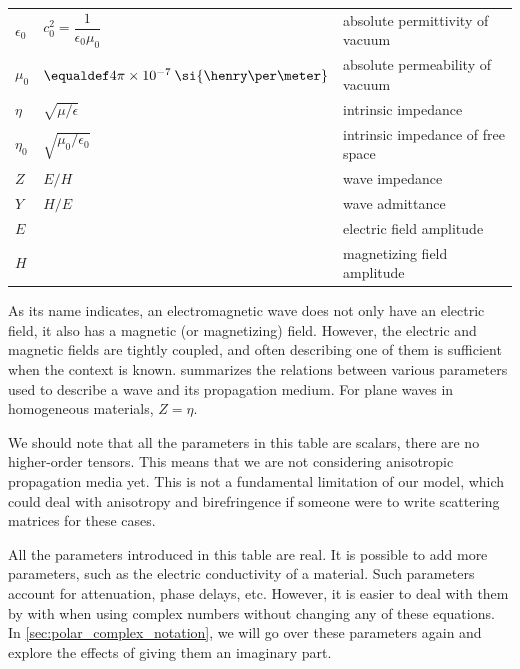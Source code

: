 \begin{table}[hbtp]
\begin{tabularx}{\textwidth}{l l X}
        $\epsilon_0$  & $c_0^2=\dfrac{1}{\epsilon_0 \mu_0}$  &  absolute permittivity of vacuum \\
        $\mu_0$       & $\equaldef 4\pi\times 10^{-7}\>\si{\henry\per\meter}$  &  absolute permeability of vacuum \\
        $\eta$        & $\sqrt{\mu / \epsilon}$  &  intrinsic impedance\\
        $\eta_0$      & $\sqrt{\mu_0 / \epsilon_0}$  &  intrinsic impedance of free space \\
        $Z$           & $E / H$  & wave impedance \\
        $Y$           & $H / E$  & wave admittance \\
        $E$           &          & electric field amplitude \\
        $H$           &          & magnetizing field amplitude \\
        \bottomrule
    \end{tabularx}
\end{table}

As its name indicates, an electromagnetic wave does not only have an electric field, it also has a magnetic (or magnetizing) field.
However, the electric and magnetic fields are tightly coupled, and often describing one of them is sufficient when the context is known.
 summarizes the relations between various parameters used to describe a wave and its propagation medium.
For plane waves in homogeneous materials, $Z=\eta$.

We should note that all the parameters in this table are scalars, there are no higher-order tensors.
This means that we are not considering anisotropic propagation media yet.
This is not a fundamental limitation of our model, which could deal with anisotropy and birefringence if someone were to write scattering matrices for these cases.

All the parameters introduced in this table are real.
It is possible to add more parameters, such as the electric conductivity of a material.
Such parameters account for attenuation, phase delays, etc.
However, it is easier to deal with them by with when using complex numbers without changing any of these equations.
In \cref{sec:polar_complex_notation}, we will go over these parameters again and explore the effects of giving them an imaginary part.





